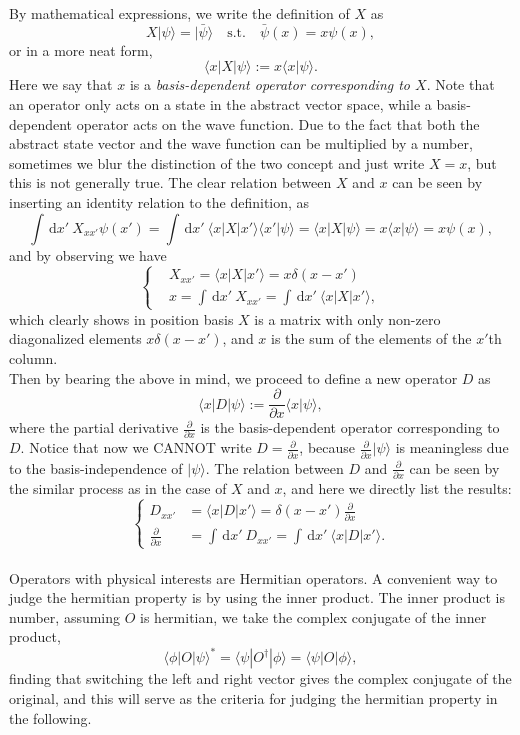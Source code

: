 \documentclass{article}
\newcommand{\be}{\begin{equation}}
\newcommand{\ee}{\end{equation}}
\newcommand{\dif}{\,\mathrm{d}}
\newcommand{\p}{\partial}
\newcommand{\1}{\left}
\newcommand{\2}{\right}
\newcommand{\la}{\langle}
\newcommand{\ra}{\rangle}
\newcommand{\del}{\delta}
\begin{document}
By mathematical expressions, we write the definition of $X$ as
\be
X|\psi\ra=|\bar\psi\ra \quad\text{s.t.}\quad \bar\psi(x)=x\psi(x),
\ee
or in a more neat form,
\be
\la x|X|\psi\ra:=x\la x|\psi\ra.
\ee
Here we say that $x$ is a \textit{basis-dependent operator corresponding to $X$}. Note that an operator only acts on a state in the abstract vector space, while a basis-dependent operator acts on the wave function. Due to the fact that both the abstract state vector and the wave function can be multiplied by a number, sometimes we blur the distinction of the two concept and just write $X=x$, but this is not generally true. The clear relation between $X$ and $x$ can be seen by inserting an identity relation to the definition, as
\be
\int \dif x'\ X_{xx'} \psi(x')=\int \dif x' \ \la x|X|x'\ra\la x'|\psi\ra=\la x|X|\psi\ra=x\la x|\psi\ra=x \psi(x),
\ee
and by observing we have 
\be\1\{\begin{split}
&X_{xx'}= \la x|X|x'\ra=x\del(x-x')\\
&x=\int \dif x'\ X_{xx'}=\int \dif x'\ \la x|X|x'\ra,
\end{split}\2.\ee
which clearly shows in position basis $X$ is a matrix with only non-zero diagonalized elements $x\del(x-x')$, and $x$ is the sum of the elements of the $x'$th column.\\

Then by bearing the above in mind, we proceed to define a new operator $D$ as
\be
\la x|D|\psi\ra:=\frac\p{\p x}\la x|\psi\ra,
\ee
where the partial derivative $\frac\p{\p x}$ is the basis-dependent operator corresponding to $D$. Notice that now we CANNOT write $D=\frac\p{\p x}$, because $\frac\p{\p x}|\psi\ra$ is meaningless due to the basis-independence of $|\psi\ra$. The relation between $D$ and $\frac\p{\p x}$ can be seen by the similar process as in the case of $X$ and $x$, and here we directly list the results:
\be\1\{\begin{split}
D_{xx'}&= \la x|D|x'\ra=\del(x-x')\frac\p{\p x}\\
\frac\p{\p x}&=\int \dif x'\ D_{xx'}=\int \dif x'\ \la x|D|x'\ra.
\end{split}\2.\ee\\

Operators with physical interests are Hermitian operators. A convenient way to judge the hermitian property is by using the inner product. The inner product is number, assuming $O$ is hermitian, we take the complex conjugate of the inner product,
\be
\la\phi|O|\psi\ra^*=\la\psi|O^\dagger|\phi\ra=\la\psi|O|\phi\ra,
\ee
finding that switching the left and right vector gives the complex conjugate of the original, and this will serve as the criteria for judging the hermitian property in the following.
\end{document}

